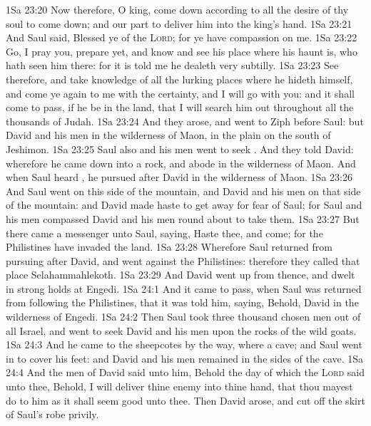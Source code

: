 \vs 1Sa 23:20 Now therefore, O king, come down according to all the desire of thy soul to come down; and our part  to deliver him into the king's hand.
\vs 1Sa 23:21 And Saul said, Blessed  ye of the \textsc{Lord}; for ye have compassion on me.
\vs 1Sa 23:22 Go, I pray you, prepare yet, and know and see his place where his haunt is,  who hath seen him there: for it is told me  he dealeth very subtilly.
\vs 1Sa 23:23 See therefore, and take knowledge of all the lurking places where he hideth himself, and come ye again to me with the certainty, and I will go with you: and it shall come to pass, if he be in the land, that I will search him out throughout all the thousands of Judah.
\vs 1Sa 23:24 And they arose, and went to Ziph before Saul: but David and his men  in the wilderness of Maon, in the plain on the south of Jeshimon.
\vs 1Sa 23:25 Saul also and his men went to seek . And they told David: wherefore he came down into a rock, and abode in the wilderness of Maon. And when Saul heard , he pursued after David in the wilderness of Maon.
\vs 1Sa 23:26 And Saul went on this side of the mountain, and David and his men on that side of the mountain: and David made haste to get away for fear of Saul; for Saul and his men compassed David and his men round about to take them.
\vs 1Sa 23:27 But there came a messenger unto Saul, saying, Haste thee, and come; for the Philistines have invaded the land.
\vs 1Sa 23:28 Wherefore Saul returned from pursuing after David, and went against the Philistines: therefore they called that place Selahammahlekoth.
\vs 1Sa 23:29 And David went up from thence, and dwelt in strong holds at Engedi.
\vs 1Sa 24:1 And it came to pass, when Saul was returned from following the Philistines, that it was told him, saying, Behold, David  in the wilderness of Engedi.
\vs 1Sa 24:2 Then Saul took three thousand chosen men out of all Israel, and went to seek David and his men upon the rocks of the wild goats.
\vs 1Sa 24:3 And he came to the sheepcotes by the way, where  a cave; and Saul went in to cover his feet: and David and his men remained in the sides of the cave.
\vs 1Sa 24:4 And the men of David said unto him, Behold the day of which the \textsc{Lord} said unto thee, Behold, I will deliver thine enemy into thine hand, that thou mayest do to him as it shall seem good unto thee. Then David arose, and cut off the skirt of Saul's robe privily.
